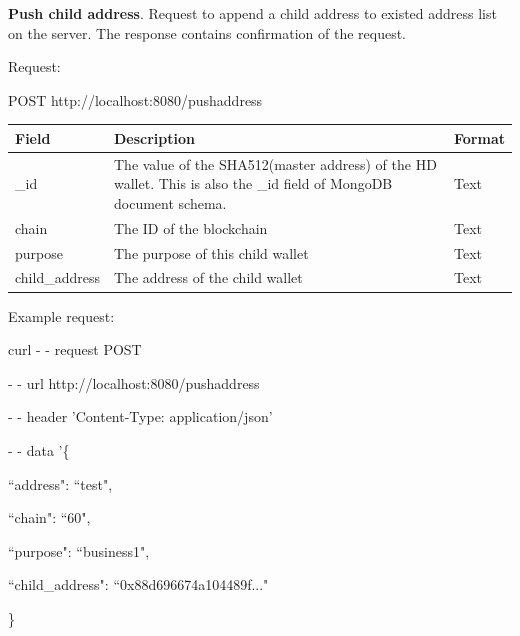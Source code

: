 \bigskip
{\textbf{Push child address}}. Request to append a child address to existed address list on the server. The response contains confirmation of the request.

Request:

\begin{framed}
    POST http://localhost:8080/pushaddress
\end{framed}

\begin{tabular}{ m{3cm}  m{9cm}  m{2.6cm} }
    \toprule
    Field & Description & Format                                            \\ 
    \midrule
    \_id & The value of the SHA512(master address) of the HD wallet. This is also the \_id field of MongoDB document schema.  & Text   \\ 
    chain   & The ID of the blockchain & Text    \\ 
    purpose   & The purpose of this child wallet & Text    \\ 
    child\_address   & The address of the child wallet & Text    \\ 
    \bottomrule
\end{tabular}
\bigskip

Example request:

\begin{framed}
\hspace*{13mm}    curl - - request POST \par
\hspace*{13mm}        - - url http://localhost:8080/pushaddress \par
\hspace*{13mm}        - - header 'Content-Type: application/json' \par
\hspace*{13mm}        - - data '\{ \par
\hspace*{27mm}                ``address": ``test",  \par
\hspace*{40mm}                ``chain": ``60", \par
\hspace*{40mm}                ``purpose": ``business1", \par
\hspace*{40mm}                ``child\_address": ``0x88d696674a104489f..." \par
\hspace*{27mm}              \} \par
\end{framed}

